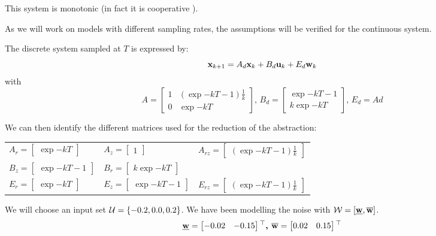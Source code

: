 This system is monotonic (in fact it is cooperative ).

As we will work on models with different sampling rates, the assumptions will be verified for the continuous system.

\newcommand{\dt}{T}
The discrete system sampled at $\dt$ is expressed by:
\begin{equation}
 \mathbf{x}_{k+1} = A_d  \mathbf{x}_k + B_d  \mathbf{u}_k + E_d  \mathbf{w}_k
\end{equation}
with
\begin{equation*} \label{eqn:sec_int_disc}
A = \begin{bmatrix}
1 & (\exp{-k \dt} - 1)\frac{1}{k}\\ 
0 & \exp{-k\dt}
\end{bmatrix}
\textrm{, }
B_d = \begin{bmatrix}
\exp{-k \dt} - 1 \\ 
k \exp{-k \dt}
\end{bmatrix}
\textrm{, }
E_d = Ad
\end{equation*}

We can then identify the different matrices used for the reduction of the abstraction:\\
\begin{tabular}{lll}
$A_r =  \begin{bmatrix} \exp{-k\dt} \end{bmatrix} $
&
$A_z =  \begin{bmatrix} 1 \end{bmatrix} $
&
$A_{rz} =  \begin{bmatrix} (\exp{-k \dt} - 1)\frac{1}{k} \end{bmatrix}$
\\
$B_z =  \begin{bmatrix} \exp{-k \dt} - 1 \end{bmatrix} $
&
$B_r =  \begin{bmatrix} k \exp{-k\dt} \end{bmatrix} $
&
\\
$E_r =  \begin{bmatrix} \exp{-k\dt} \end{bmatrix} $
&
$E_z =  \begin{bmatrix} \exp{-k \dt} - 1 \end{bmatrix} $
&
$E_{rz} =  \begin{bmatrix} (\exp{-k \dt} - 1)\frac{1}{k} \end{bmatrix}$
\end{tabular}

We will choose an input set $\mathcal{U} = \{-0.2,0.0,0.2\}$.
We have been modelling the noise with $\mathcal{W} = [\underline{ \mathbf{w}},\overline{ \mathbf{w}}]$.
\begin{equation}
\underline{ \mathbf{w}} = \begin{bmatrix} -0.02&-0.15 \end{bmatrix} {}^\top
\textbf{, }
\overline{ \mathbf{w}} = \begin{bmatrix}  0.02& 0.15 \end{bmatrix} {}^\top
\end{equation}

